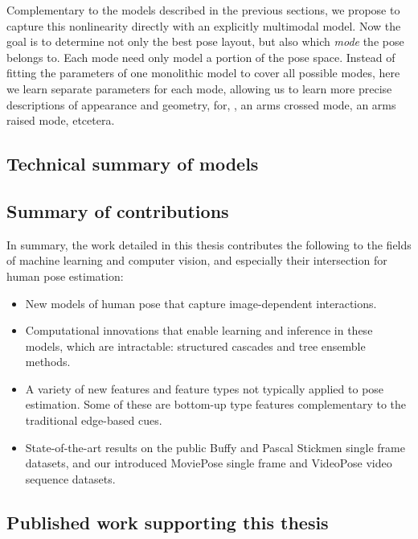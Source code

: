 Complementary to the models described in the previous sections, we propose to 
capture this nonlinearity directly with an explicitly multimodal model.  Now 
the goal is to determine not only the best pose layout, but also which {\em 
mode} the pose belongs to.
Each mode need only model a portion of the pose space.  Instead of fitting the 
parameters of one monolithic model to cover all possible modes, here we learn 
separate parameters for each mode, allowing us to learn more precise 
descriptions of appearance and geometry, for, \eg, an arms crossed mode, an 
arms raised mode, etcetera. 

\subsection{Technical summary of models}



\subsection{Summary of contributions}

In summary, the work detailed in this thesis contributes the following to the 
fields of machine learning and computer vision, and especially their 
intersection for human pose estimation:
\begin{itemize}

\item New models of human pose that capture image-dependent interactions.

\item Computational innovations that enable learning and inference in these 
models, which are \naively intractable: structured cascades and tree ensemble 
methods.

\item A variety of new features and feature types not typically applied to pose 
estimation.  Some of these are bottom-up type features complementary to the 
traditional edge-based cues.

\item State-of-the-art results on the public Buffy and Pascal Stickmen single 
frame datasets, and our introduced MoviePose single frame and VideoPose video 
sequence datasets.

\end{itemize}


\subsection{Published work supporting this thesis}


